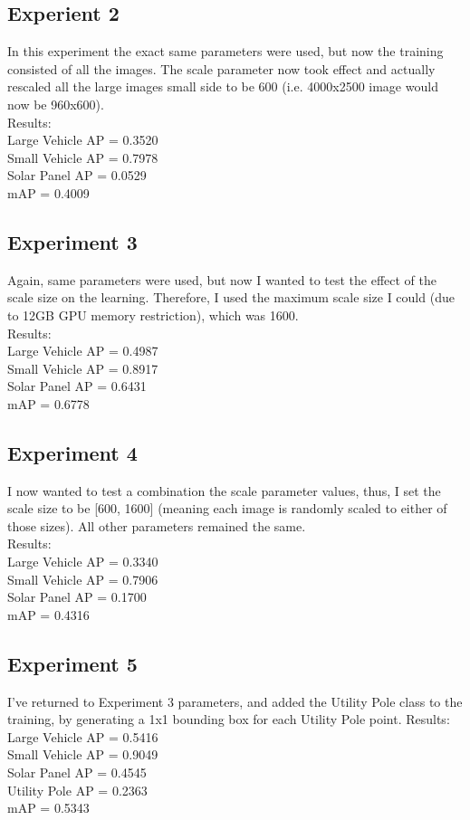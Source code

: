 \documentclass[]{article}
\begin{document}
\subsection{Experient 2}
In this experiment the exact same parameters were used, but now the training consisted of all the images. The scale parameter now took effect and actually rescaled all the large images small side to be 600 (i.e. 4000x2500 image would now be 960x600).\\
Results:\\
Large Vehicle AP = 0.3520\\
Small Vehicle AP = 0.7978\\
Solar Panel AP = 0.0529\\
mAP = 0.4009

\subsection{Experiment 3}
Again, same parameters were used, but now I wanted to test the effect of the scale size on the learning. Therefore, I used the maximum scale size I could (due to 12GB GPU memory restriction), which was 1600.\\
Results:\\
Large Vehicle AP = 0.4987\\
Small Vehicle AP = 0.8917\\
Solar Panel AP = 0.6431\\
mAP = 0.6778

\subsection{Experiment 4}
I now wanted to test a combination the scale parameter values, thus, I set the scale size to be [600, 1600] (meaning each image is randomly scaled to either of those sizes). All other parameters remained the same.\\
Results:\\
Large Vehicle AP = 0.3340\\
Small Vehicle AP = 0.7906\\
Solar Panel AP = 0.1700\\
mAP = 0.4316

\subsection{Experiment 5}
I've returned to Experiment 3 parameters, and added the Utility Pole class to the training, by generating a 1x1 bounding box for each Utility Pole point.
Results:\\
Large Vehicle AP = 0.5416\\
Small Vehicle AP = 0.9049\\
Solar Panel AP = 0.4545\\
Utility Pole AP = 0.2363\\
mAP = 0.5343
\end{document}
